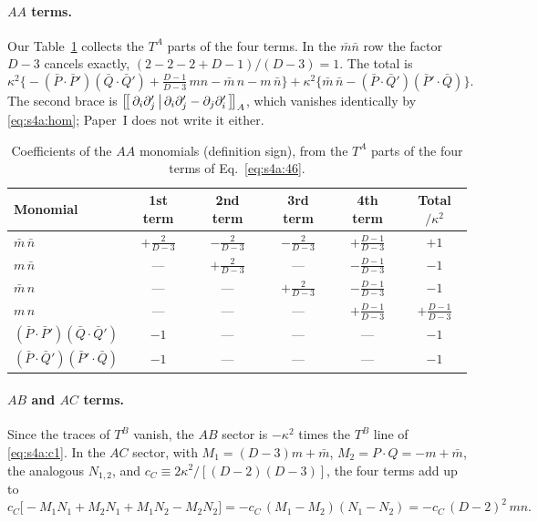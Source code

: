 \documentclass[aps,prd,onecolumn,10pt,nofootinbib,floatfix]{revtex4-2}
\newcommand{\PI}{Paper~I}
\begin{document}
\paragraph*{$AA$ terms.}
Our Table~\ref{tab:s4a:AA} collects the $T^A$ parts of the four terms. In the $\bar m\bar n$ row the factor
$D-3$ cancels exactly, $(2-2-2+D-1)/(D-3)=1$. The total is
\begin{equation}
\kappa^2\Big\{-(\bar P\!\cdot\!\bar P')(\bar Q\!\cdot\!\bar Q')+\tfrac{D-1}{D-3}\,mn-\bar m\,n-m\,\bar n\Big\}
+\kappa^2\Big\{\bar m\,\bar n-(\bar P\!\cdot\!\bar Q')(\bar P'\!\cdot\!\bar Q)\Big\}.
\label{eq:s4a:AAsum}
\end{equation}
The second brace is $\big[\!\big[\,\partial_i\partial'_j\,\big|\,\partial_i\partial'_j-\partial_j\partial'_i\,\big]\!\big]_{A}$, which vanishes
identically by \eqref{eq:s4a:hom}; \PI{} does not write it either.

\begin{table}[htbp]
\caption{Coefficients of the $AA$ monomials (definition sign), from the $T^A$ parts of the four terms
of Eq.~\eqref{eq:s4a:46}.}
\label{tab:s4a:AA}
\renewcommand{\arraystretch}{1.3}
\begin{ruledtabular}
\begin{tabular}{lccccc}
Monomial & 1st term & 2nd term & 3rd term & 4th term & Total$/\kappa^2$\\
\hline
$\bar m\,\bar n$ & $+\frac2{D-3}$ & $-\frac2{D-3}$ & $-\frac2{D-3}$ & $+\frac{D-1}{D-3}$ & $+1$\\
$m\,\bar n$ & --- & $+\frac2{D-3}$ & --- & $-\frac{D-1}{D-3}$ & $-1$\\
$\bar m\,n$ & --- & --- & $+\frac2{D-3}$ & $-\frac{D-1}{D-3}$ & $-1$\\
$m\,n$ & --- & --- & --- & $+\frac{D-1}{D-3}$ & $+\frac{D-1}{D-3}$\\
$(\bar P\!\cdot\!\bar P')(\bar Q\!\cdot\!\bar Q')$ & $-1$ & --- & --- & --- & $-1$\\
$(\bar P\!\cdot\!\bar Q')(\bar P'\!\cdot\!\bar Q)$ & $-1$ & --- & --- & --- & $-1$\\
\end{tabular}
\end{ruledtabular}
\end{table}

\paragraph*{$AB$ and $AC$ terms.}
Since the traces of $T^B$ vanish, the $AB$ sector is $-\kappa^2$ times the $T^B$ line of
\eqref{eq:s4a:c1}. In the $AC$ sector, with $M_1=(D-3)m+\bar m$, $M_2=P\!\cdot\!Q=-m+\bar m$, the
analogous $N_{1,2}$, and $c_C\equiv2\kappa^2/[(D-2)(D-3)]$, the four terms add up to
\begin{equation}
c_C\big[-M_1N_1+M_2N_1+M_1N_2-M_2N_2\big]=-c_C\,(M_1-M_2)(N_1-N_2)=-c_C\,(D-2)^2\,mn .
\label{eq:s4a:ACfac}
\end{equation}
\end{document}
